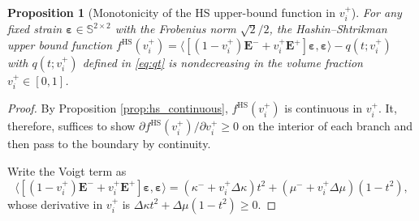 \documentclass[preprint,3p]{elsarticle}
\newcommand{\tenss}[1]{\bm{\mathbf{#1}}}            %
\newcommand{\tensf}[1]{\bm{\mathbf{#1}}}            %
\newcommand{\strain}{\tenss{\varepsilon}}           %
\newcommand{\Emin}{\tensf{E}^{-}}                   %
\newcommand{\Emax}{\tensf{E}^{+}}                   %
\newtheorem{proposition}{Proposition}[section]
\begin{document}
\begin{proposition}[Monotonicity of the HS upper-bound function in $v_i^+$]\label{prop:hs_monotone}
    For any fixed strain $\strain \in \mathbb{S}^{2\times2}$ with the Frobenius norm $\sqrt{2}/2$, the Hashin--Shtrikman upper bound function $f^{\mathrm{HS}} (v_i^+)=\langle [(1-v_i^+)\Emin + v_i^+ \Emax ]\strain,\strain \rangle - q(t;v_i^+)$ with $q(t;v_i^+)$ defined in \eqref{eq:qt} is nondecreasing in the volume fraction $v_i^+ \in [0,1]$.
\end{proposition}
\begin{proof}
    By Proposition \ref{prop:hs_continuous}, $f^{\mathrm{HS}} (v_i^+)$ is continuous in $v_i^+$. It, therefore, suffices to show $\partial f^{\mathrm{HS}} (v_i^+)/\partial v_i^+ \ge 0$ on the interior of each branch and then pass to the boundary by continuity.

    Write the Voigt term as
    \begin{equation}
        \langle [(1-v_i^+)\Emin + v_i^+ \Emax ]\strain,\strain \rangle = 
        (\kappa^- + v_i^+\Delta\kappa) t^2 + (\mu^- + v_i^+ \Delta\mu) (1-t^2),
    \end{equation}
    whose derivative in $v_i^+$ is $\Delta\kappa t^2 + \Delta\mu (1-t^2) \ge 0$.


\end{proof}
\end{document}
